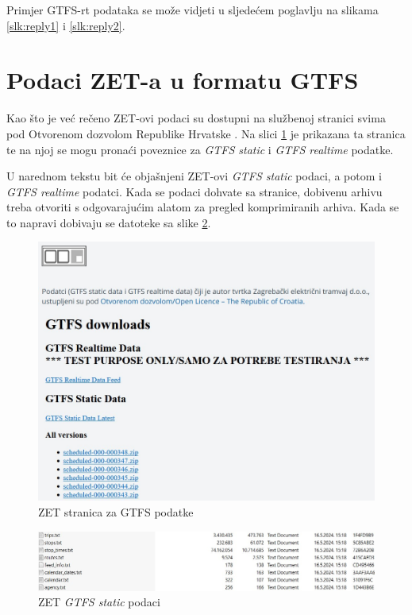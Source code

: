 \documentclass[zavrsnirad]{fer}
\begin{document}
Primjer GTFS-rt podataka se može vidjeti u sljedećem poglavlju na slikama \ref{slk:reply1} i \ref{slk:reply2}.

\section{Podaci ZET-a u formatu GTFS}
\label{sec:zet-gtfs}

Kao što je već rečeno ZET-ovi podaci su dostupni na službenoj stranici svima pod Otvorenom dozvolom Republike Hrvatske \cite{ZET-GTFS}. Na slici \ref{slk:zet-stranica} je prikazana ta stranica te na njoj se mogu pronaći poveznice za \textit{GTFS static} i \textit{GTFS realtime} podatke.

U narednom tekstu bit će objašnjeni ZET-ovi \textit{GTFS static} podaci, a potom i \textit{GTFS realtime} podatci. Kada se podaci dohvate sa stranice, dobivenu arhivu treba otvoriti s odgovarajućim alatom za pregled komprimiranih arhiva. Kada se to napravi dobivaju se datoteke sa slike \ref{slk:zet-podaci}.

\begin{figure}[htb]
	\centering
	\includegraphics[width=0.7\linewidth]{Figures/zet-stranica.jpg} 
	\caption{ZET stranica za GTFS podatke}
	\label{slk:zet-stranica}
\end{figure} 

\begin{figure}[htb]
	\centering
	\includegraphics[width=0.7\linewidth]{Figures/zet-podaci.jpg} 
	\caption{ZET \textit{GTFS static} podaci}
	\label{slk:zet-podaci}
\end{figure} 
\end{document}
